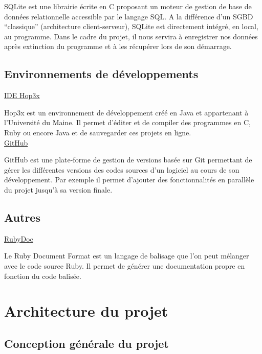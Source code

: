 \documentclass[a4paper, 12pt, twoside]{article}
\begin{document}
SQLite est une librairie écrite en C proposant un moteur de gestion de base de données relationnelle accessible par le langage SQL. A la différence d’un SGBD “classique” (architecture client-serveur), SQLite est directement intégré, en local, au programme. Dans le cadre du projet, il nous servira à enregistrer nos données après extinction du programme et à les récupérer lors de son démarrage.\\

\subsection{Environnements de développements}

\ul{IDE Hop3x}\newline

Hop3x est un environnement de développement créé en Java et appartenant à l’Université du Maine. Il permet d’éditer et de compiler des programmes en C, Ruby ou encore Java et de sauvegarder ces projets en ligne.\\

\ul{GitHub}\newline

GitHub est une plate-forme de gestion de versions basée sur Git permettant de gérer les différentes versions des codes sources d’un logiciel au cours de son développement. Par exemple il permet d’ajouter des fonctionnalités en parallèle du projet jusqu’à sa version finale.\\

\subsection{Autres}

\ul{RubyDoc}\newline

Le Ruby Document Format est un langage de balisage que l’on peut mélanger avec le code source Ruby. Il permet de générer une documentation propre en fonction du code balisée.\\

\newpage
\section{Architecture du projet}

\subsection{Conception générale du projet}
\end{document}
